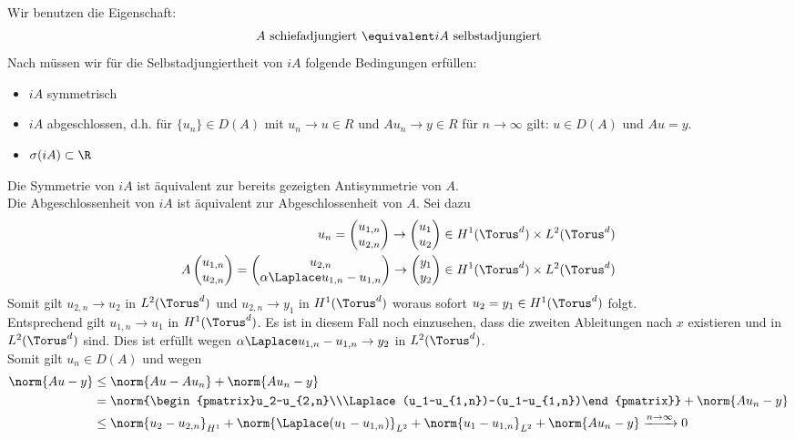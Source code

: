 Wir benutzen die Eigenschaft:
\[A \text{ schiefadjungiert } \equivalent iA \text{ selbstadjungiert}\]
Nach \autocite[Bemerkung 5.6f]{HundSchnau} müssen wir für die Selbstadjungiertheit von $iA$ folgende Bedingungen erfüllen:
\begin{itemize}
\item $iA$ symmetrisch
\item $iA$ abgeschlossen, d.h. für $\lbrace u_n \rbrace \in D(A)$ mit $u_n\to u\in R$ und $Au_n\to y\in R$ für $n\to\infty$ gilt: $u\in D(A)$ und $Au=y$.
\item $\sigma(iA)\subset \R$
\end{itemize}
Die Symmetrie von $iA$ ist äquivalent zur bereits gezeigten Antisymmetrie von $A$.\\
Die Abgeschlossenheit von $iA$ ist äquivalent zur Abgeschlossenheit von $A$. Sei dazu
\begin{align*}
u_n=\begin{pmatrix}u_{1,n}\\u_{2,n}\end{pmatrix}\to\begin{pmatrix}u_1\\u_2\end{pmatrix}\in H^1(\Torus^d)\times L^2(\Torus^d)\\
A\begin{pmatrix}u_{1,n}\\u_{2,n}\end{pmatrix}=\begin{pmatrix}u_{2,n}\\\alpha\Laplace u_{1,n}-u_{1,n}\end{pmatrix}\to\begin{pmatrix}y_1\\y_2\end{pmatrix}\in H^1(\Torus^d)\times L^2(\Torus^d)
\end{align*} 
Somit gilt $u_{2,n}\to u_2$ in $L^2(\Torus^d)$ und $u_{2,n}\to y_1$ in $H^1(\Torus^d)$ woraus sofort $u_2=y_1\in H^1(\Torus^d)$ folgt.\\
Entsprechend gilt $u_{1,n}\to u_1$ in $H^1(\Torus^d)$. Es ist in diesem Fall noch einzusehen, dass die zweiten Ableitungen nach $x$ existieren und in $L^2(\Torus^d)$ sind. Dies ist erfüllt wegen $\alpha \Laplace u_{1,n}-u_{1,n}\to y_2$ in $L^2(\Torus^d)$.\\
Somit gilt $u_n\in D(A)$ und wegen 
\begin{align*}
\norm{Au-y}&\le \norm{Au-Au_n}+\norm{Au_n-y}\\
&=\norm{\begin{pmatrix}u_2-u_{2,n}\\\Laplace(u_1-u_{1,n})-(u_1-u_{1,n})\end{pmatrix}}+\norm{Au_n-y}\\
&\le \norm{u_2-u_{2,n}}_{H^1}+\norm{\Laplace(u_1-u_{1,n})}_{L^2}+\norm{u_1-u_{1,n}}_{L^2}+\norm{Au_n-y}\xrightarrow{n \to \infty }0
\end{align*}

